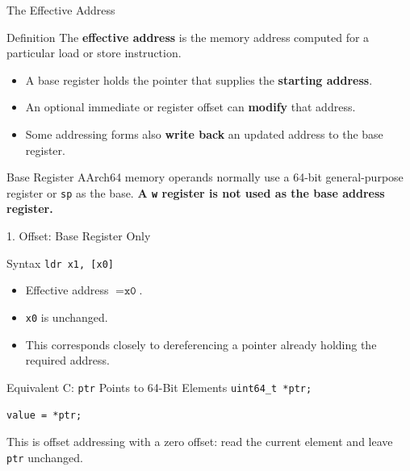 \documentclass[aspectratio=169,11pt,t]{beamer}
\newcommand{\code}[1]{\texttt{#1}}
\begin{document}



\begin{frame}{The Effective Address}
\begin{block}{Definition}
The \textbf{effective address} is the memory address computed for a particular load or store instruction.
\end{block}
\vspace{0.25cm}
\begin{itemize}
\item A base register holds the pointer that supplies the \textbf{starting address}.
\item An optional immediate or register offset can \textbf{modify} that address.
\item Some addressing forms also \textbf{write back} an updated address to the base register.
\end{itemize}
\vspace{0.2cm}
\begin{block}{Base Register}
AArch64 memory operands normally use a 64-bit general-purpose register or \code{sp} as the base. \textbf{A \code{w} register is not used as the base address register.}
\end{block}
\end{frame}




\begin{frame}{1. Offset: Base Register Only}
\begin{block}{Syntax}
\large
\hspace{4.0cm}\code{ldr x1, [x0]}
\normalsize
\end{block}
\vspace{0.25cm}
\begin{itemize}
\item Effective address $= \code{x0}$.
\item \code{x0} is unchanged.
\item This corresponds closely to dereferencing a pointer already holding the required address.
\end{itemize}
\vspace{0.2cm}
\begin{block}{Equivalent C: \code{ptr} Points to 64-Bit Elements}
\code{uint64\_t *ptr;}\par
\code{value = *ptr;}\par This is offset addressing with a zero offset: read the current element and leave \code{ptr} unchanged.
\end{block}
\end{frame}
\end{document}
